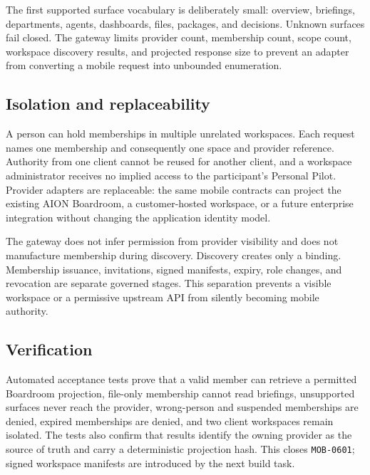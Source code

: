 The first supported surface vocabulary is deliberately small: overview, briefings,
departments, agents, dashboards, files, packages, and decisions.  Unknown surfaces fail
closed.  The gateway limits provider count, membership count, scope count, workspace
discovery results, and projected response size to prevent an adapter from converting a
mobile request into unbounded enumeration.

\subsection{Isolation and replaceability}

A person can hold memberships in multiple unrelated workspaces.  Each request names one
membership and consequently one space and provider reference.  Authority from one client
cannot be reused for another client, and a workspace administrator receives no implied
access to the participant's Personal Pilot.  Provider adapters are replaceable: the same
mobile contracts can project the existing AION Boardroom, a customer-hosted workspace,
or a future enterprise integration without changing the application identity model.

The gateway does not infer permission from provider visibility and does not manufacture
membership during discovery.  Discovery creates only a binding.  Membership issuance,
invitations, signed manifests, expiry, role changes, and revocation are separate governed
stages.  This separation prevents a visible workspace or a permissive upstream API from
silently becoming mobile authority.

\subsection{Verification}

Automated acceptance tests prove that a valid member can retrieve a permitted Boardroom
projection, file-only membership cannot read briefings, unsupported surfaces never reach
the provider, wrong-person and suspended memberships are denied, expired memberships are
denied, and two client workspaces remain isolated.  The tests also confirm that results
identify the owning provider as the source of truth and carry a deterministic projection
hash.  This closes \texttt{MOB-0601}; signed workspace manifests are introduced by the
next build task.

